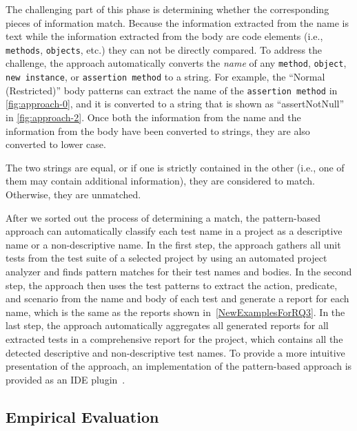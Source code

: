 \documentclass[proposal.tex]{subfiles}
\begin{document}
The challenging part of this phase is determining whether the corresponding pieces of information match.
%
Because the information extracted from the name is text while the information extracted from the body are code elements (i.e., \texttt{methods}, \texttt{objects}, etc.) they can not be directly compared.
%
To address the challenge, the approach automatically converts the \emph{name} of any \texttt{method}, \texttt{object}, \texttt{new instance}, or \texttt{assertion method} to a string.
%
For example, the \enquote{Normal (Restricted)} body patterns can extract the name of the \texttt{assertion method} in \cref{fig:approach-0}, and it is converted to a string that is shown as \enquote{assertNotNull} in \cref{fig:approach-2}.
%
Once both the information from the name and the information from the body have been converted to strings, they are also converted to lower case.


The two strings are equal, or if one is strictly contained in the other (i.e., one of them may contain additional information), they are considered to match.
%
Otherwise, they are unmatched.


After we sorted out the process of determining a match, the pattern-based approach can automatically classify each test name in a project as a descriptive name or a non-descriptive name.
%
In the first step, the approach gathers all unit tests from the test suite of a selected project by using an automated project analyzer and finds pattern matches for their test names and bodies.
%
In the second step, the approach then uses the test patterns to extract the action, predicate, and scenario from the name and body of each test and generate a report for each name, which is the same as the reports shown in~\cref{NewExamplesForRQ3}.
%
In the last step, the approach automatically aggregates all generated reports for all extracted tests in a comprehensive report for the project, which contains all the detected descriptive and non-descriptive test names.
%
To provide a more intuitive presentation of the approach, an implementation of the pattern-based approach is provided as an IDE plugin~\cite{prototype}.

\subsection{Empirical Evaluation}
\label{sec:evaluation}
\end{document}
